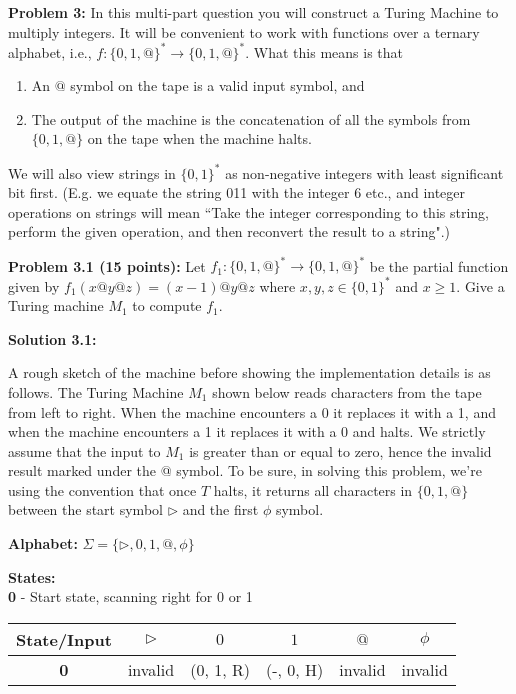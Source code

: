 \documentclass[11pt]{article}
\begin{document}
\newpage


\textbf{Problem 3:} In this multi-part question you will construct a Turing Machine to multiply integers. It will be convenient to work with functions over a ternary alphabet, i.e., $f:\{0,1,@\}^* \to  \{0,1,@\}^*$. What this means is that
\begin{enumerate}
\item An $@$ symbol on the tape is a valid input symbol, and 
\item The output of the machine is the concatenation of all the symbols from $\{0,1,@\}$ on the tape when the machine halts. 
\end{enumerate}
We will also view strings in $\{0,1\}^*$ as non-negative integers with least significant bit first. (E.g. we equate the string 011 with the integer 6 etc., and integer operations on strings will mean ``Take the integer corresponding to this string, perform the given operation, and then reconvert the result to a string".)

\textbf{Problem 3.1 (15 points):} Let $f_1:\{0,1,@\}^* \to  \{0,1,@\}^*$ be the partial function given by $f_1(x@y@z) = (x-1) @ y @ z$ where $x,y,z \in \{0,1\}^*$ and $x \ge 1$. Give a Turing machine $M_1$ to compute $f_1$.

\textbf{Solution 3.1:} 

A rough sketch of the machine before showing the implementation details is as follows. The Turing Machine $M_1$ shown below reads characters from the tape from left to right. When the machine encounters a 0 it replaces it with a 1, and when the machine encounters a 1 it replaces it with a 0 and halts. We strictly assume that the input to $M_1$ is greater than or equal to zero, hence the invalid result marked under the @ symbol. To be sure, in solving this problem, we're using the convention that once $T$ halts, it returns all characters in $\{0, 1, @\}$ between the start symbol $\triangleright$ and the first $\phi$ symbol.

\textbf{Alphabet:} $\Sigma = \{\triangleright, 0, 1, @, \phi\}$

\textbf{States:}\\
\textbf{0} - Start state, scanning right for 0 or 1

\begin{center}
\begin{tabular}{ | c | c | c | c | c | c |}
	\hline
	\textbf{State/Input} & $\triangleright$ & $0$ & $1$ & $@$ & $\phi$ \\
	\hline\hline
	\textbf{0} & invalid & (0, 1, R) & (-, 0, H) & invalid & invalid \\
	\hline
\end{tabular}
\end{center}
\end{document}
